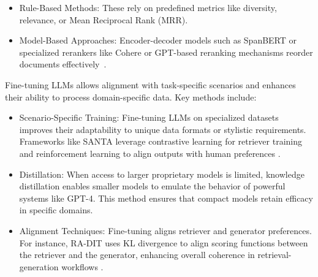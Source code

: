 \begin{enumerate}
{	      \begin{itemize}
		      \item Rule-Based Methods: These rely on predefined metrics like diversity, relevance, or Mean Reciprocal Rank (MRR).
		      \item Model-Based Approaches: Encoder-decoder models such as SpanBERT or specialized rerankers like Cohere or GPT-based reranking mechanisms reorder documents effectively~\cite{yu2022generate, zheng2023take}.
	      \end{itemize}

	      Fine-tuning LLMs allows alignment with task-specific scenarios and enhances their ability to process domain-specific data. Key methods include:
	      \begin{itemize}
		      \item
		            { Scenario-Specific Training:
		            Fine-tuning LLMs on specialized datasets improves their adaptability to unique data formats or stylistic requirements. Frameworks like SANTA leverage contrastive learning for retriever training and reinforcement learning to align outputs with human preferences \cite{shao2023enhancing, cheng2023lift}.}
		      \item { Distillation:
		            When access to larger proprietary models is limited, knowledge distillation enables smaller models to emulate the behavior of powerful systems like GPT-4. This method ensures that compact models retain efficacy in specific domains.}
		      \item { Alignment Techniques:
		            Fine-tuning aligns retriever and generator preferences. For instance, RA-DIT uses KL divergence to align scoring functions between the retriever and the generator, enhancing overall coherence in retrieval-generation workflows \cite{asai2023selfrag}. }
	      \end{itemize}
	      }


\end{enumerate}

